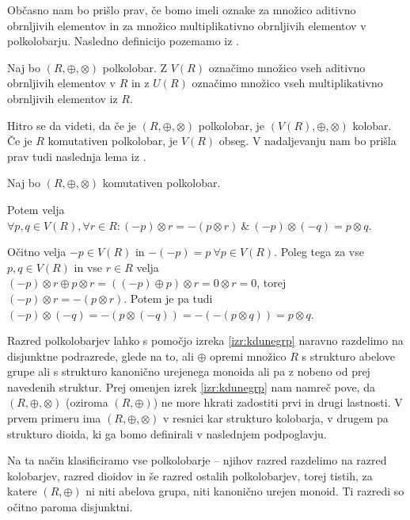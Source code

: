 \documentclass[mat1]{fmfdelo}
\begin{document}
Občasno nam bo prišlo prav, če bomo imeli oznake za množico aditivno obrnljivih elementov in za množico multiplikativno obrnljivih elementov v polkolobarju. Nasledno definicijo pozemamo iz \cite[str. 3]{bib:Tanbase}.

\begin{definicija}
	Naj bo $(R, \oplus, \otimes)$ polkolobar. Z $V(R)$ označimo množico vseh aditivno obrnljivih elementov v $R$ in z $U(R)$ označimo množico vseh multiplikativno obrnljivih elementov iz $R$.
\end{definicija}

Hitro se da videti, da če je $(R, \oplus, \otimes)$ polkolobar, je $(V(R), \oplus, \otimes)$ kolobar. Če je $R$ komutativen polkolobar, je $V(R)$ obseg. V nadaljevanju nam bo prišla prav tudi naslednja lema iz \cite[Lema 2\,1]{bib:Tanbase}.

\begin{lema} \label{lema:invvpolkolob}
	Naj bo $(R, \oplus, \otimes)$ komutativen polkolobar. 
	
	Potem velja $\forall p, q\in V(R), \forall r\in R: (-p)\otimes r = - (p\otimes r)~\&~ (-p)\otimes(-q) = p\otimes q$.
\end{lema}

\begin{dokaz}
	Očitno velja $-p\in V(R)$ in $-(-p) = p~\forall p\in V(R)$. Poleg tega za vse $p, q\in V(R)$ in vse $r\in R$ velja $(-p)\otimes r \oplus p \otimes r = ((-p) \oplus p)\otimes r = 0\otimes r = 0$, torej $(-p)\otimes r = -(p\otimes r)$. Potem je pa tudi $(-p)\otimes(-q) = -(p\otimes(-q)) = -(-(p\otimes q)) = p\otimes q$.
\end{dokaz}

	Razred polkolobarjev lahko s pomočjo izreka \ref{izr:kdunegrp} naravno razdelimo na disjunktne podrazrede, glede na to, ali $\oplus$ opremi množico $R$ s strukturo abelove grupe ali s strukturo kanonično urejenega monoida ali pa z nobeno od prej navedenih struktur. Prej omenjen izrek \ref{izr:kdunegrp} nam namreč pove, da $(R, \oplus, \otimes)$ (oziroma $(R, \oplus)$) ne more hkrati zadostiti prvi in drugi lastnosti. V prvem primeru ima $(R, \oplus, \otimes)$ v resnici kar strukturo kolobarja, v drugem pa strukturo dioida, ki ga bomo definirali v naslednjem podpoglavju.
	
	Na ta način klasificiramo vse polkolobarje -- njihov razred razdelimo na razred kolobarjev, razred dioidov in še razred ostalih polkolobarjev, torej tistih, za katere $(R, \oplus)$ ni niti abelova grupa, niti kanonično urejen monoid. Ti razredi so očitno paroma disjunktni.
\end{document}
